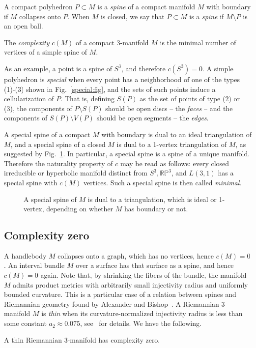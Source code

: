 \documentclass[10pt]{article}      %
\newcommand{\matRP} {\ensuremath {\mathbb{RP}}}
\begin{document}
A compact polyhedron $P\subset M$ is a \emph{spine} of a compact manifold $M$ with boundary
if $M$ collapses onto $P$. When $M$ is closed, we say that $P\subset M$ is a \emph{spine}
if $M\setminus P$ is an open ball. 
\begin{defn}
The \emph{complexity} $c(M)$ of
a compact 3-manifold $M$ is the minimal number of vertices of
a simple spine of $M$.
\end{defn}
As an example, a point is a spine of $S^3$, and therefore $c(S^3)=0$.
A simple polyhedron is \emph{special} when
every point has a neighborhood of one of the types (1)-(3) shown in
Fig.~\ref{special:fig}, and the sets of such points induce a
cellularization of $P$. That is, defining $S(P)$ as the set of points of type (2) or (3),
the components of $P \setminus S(P)$ 
should be open discs -- the \emph{faces} -- and the components of $S(P)\setminus V(P)$ 
should be open
segments -- the \emph{edges}.
\begin{remark} \label{spine:triangulation:rem}
A special spine of a compact $M$ with boundary is dual to an ideal triangulation of $M$,
and a special spine of a closed $M$ is dual to a 1-vertex triangulation of $M$, as suggested
by Fig.~\ref{dualspine:fig}. In particular, a special spine is a spine of a unique
manifold. Therefore the naturality property of $c$ may be read as follows:
every closed irreducible or hyperbolic manifold distinct from $S^3,\matRP^3$, and $L(3,1)$
has a special spine with $c(M)$ vertices. Such a special spine is then called \emph{minimal}.
\end{remark}
\begin{figure}
\caption{A special spine of $M$ is dual to a triangulation, which is ideal or 1-vertex, depending
on whether $M$ has boundary or not.}
\label{dualspine:fig}
\end{figure}

\subsection{Complexity zero}
A handlebody $M$ collapses onto a graph, which has no vertices, hence $c(M)=0$.
An interval bundle $M$ over a surface has that surface as a spine, and hence $c(M)=0$ again.
Note that, by shrinking the fibers of the bundle,
the manifold $M$ admits product metrics with arbitrarily small
injectivity radius and uniformly bounded curvature. This is a particular case of
a relation between spines and Riemannian geometry found
by Alexander and Bishop~\cite{AleBi}.
A Riemannian 3-manifold $M$ is \emph{thin} when
its curvature-normalized injectivity radius is less than some constant $a_2\approx 0.075$,
see~\cite{AleBi} for details. We have the following.
\begin{proposition}
A thin Riemannian 3-manifold has complexity zero.
\end{proposition}
\end{document}
